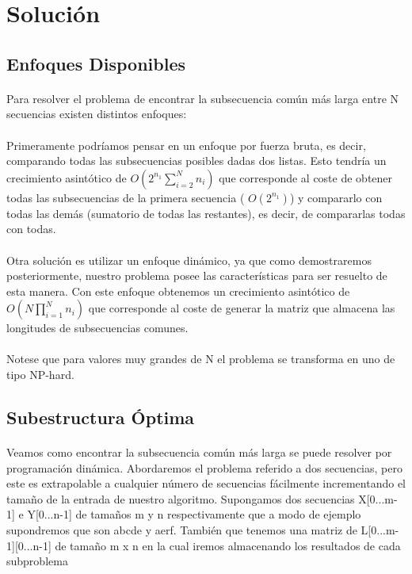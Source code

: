 \documentclass{article}
\begin{document}
\section{Solución}
	\subsection{Enfoques Disponibles}
		\paragraph{}
		Para resolver el problema de encontrar la subsecuencia común más larga entre N secuencias existen distintos enfoques:
		
		\paragraph{}
		 Primeramente podríamos pensar en un enfoque por fuerza bruta, es decir, comparando todas las subsecuencias posibles dadas dos listas. Esto tendría un crecimiento asintótico de $O(2^{n_{1}}\sum_{i = 2}^{N}n_{i})$ que corresponde al coste de obtener todas las subsecuencias de la primera secuencia ( $O(2^{n_{1}})$) y compararlo con todas las demás  (sumatorio de todas las restantes), es decir, de compararlas todas con todas.
		 
		\paragraph{}
		 Otra solución es utilizar un enfoque dinámico, ya que como demostraremos posteriormente, nuestro problema posee las características para ser resuelto de esta manera. Con este enfoque obtenemos un crecimiento asintótico de  $O(N\prod_{i = 1}^{N}n_{i})$ que corresponde al coste de generar la matriz que almacena las longitudes de subsecuencias comunes.

		\paragraph{}
		Notese que para valores muy grandes de N el problema se transforma en uno de tipo NP-hard.
	\subsection{Subestructura Óptima}
		\paragraph{}
		Veamos como encontrar la subsecuencia común más larga se puede resolver por programación dinámica. Abordaremos el problema referido a dos secuencias, pero este es extrapolable a cualquier número de secuencias fácilmente incrementando el tamaño de la entrada de nuestro algoritmo. 
		\newline{}
		Supongamos dos secuencias X[0...m-1] e Y[0...n-1] de tamaños m y n respectivamente que a modo de ejemplo supondremos que son abcde y aerf.
		\newline{}
		También que tenemos una matriz de L[0...m-1][0...n-1] de tamaño m x n en la cual iremos almacenando los resultados de cada subproblema
\end{document}
